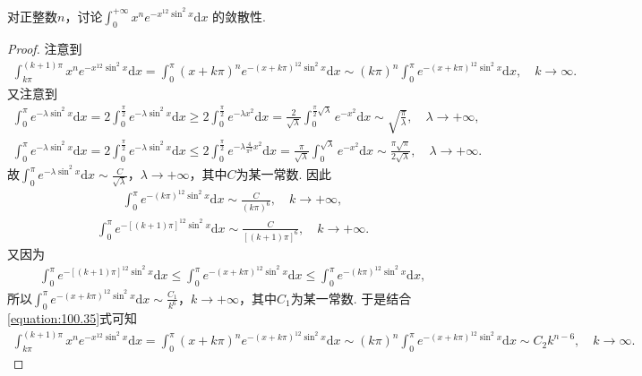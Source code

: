 \documentclass[../../main.tex]{subfiles}
\begin{document}
\begin{example}
对正整数\(n\)，讨论$\int_{0}^{+\infty}x^{n}e^{-x^{12}\sin^{2}x}\mathrm{d}x$
的敛散性. 
\end{example}
\begin{proof}
注意到
\begin{align}\label{equation:100.35}
\int_{k\pi}^{(k+1)\pi}x^ne^{-x^{12}\sin^2x}\mathrm{d}x=\int_0^{\pi}(x+k\pi)^ne^{-(x+k\pi)^{12}\sin^2x}\mathrm{d}x\sim (k\pi)^n\int_0^{\pi}e^{-(x+k\pi)^{12}\sin^2x}\mathrm{d}x,\quad k\rightarrow \infty.
\end{align}
又注意到
\begin{align*}
\int_0^{\pi}e^{-\lambda \sin^2x}\mathrm{d}x=2\int_0^{\frac{\pi}{2}}e^{-\lambda \sin^2x}\mathrm{d}x\geqslant 2\int_0^{\frac{\pi}{2}}e^{-\lambda x^2}\mathrm{d}x=\frac{2}{\sqrt{\lambda}}\int_0^{\frac{\pi}{2}\sqrt{\lambda}}e^{-x^2}\mathrm{d}x\sim \sqrt{\frac{\pi}{\lambda}},\quad \lambda \rightarrow +\infty,
\end{align*}
\begin{align*}
\int_0^{\pi}e^{-\lambda \sin^2x}\mathrm{d}x=2\int_0^{\frac{\pi}{2}}e^{-\lambda \sin^2x}\mathrm{d}x\leqslant 2\int_0^{\frac{\pi}{2}}e^{-\lambda \frac{4}{\pi^2}x^2}\mathrm{d}x=\frac{\pi}{\sqrt{\lambda}}\int_0^{\sqrt{\lambda}}e^{-x^2}\mathrm{d}x\sim \frac{\pi \sqrt{\pi}}{2\sqrt{\lambda}},\quad \lambda \rightarrow +\infty.
\end{align*}
故$\int_0^{\pi}e^{-\lambda \sin^2x}\mathrm{d}x\sim \frac{C}{\sqrt{\lambda}}$，$\lambda \rightarrow +\infty$，其中$C$为某一常数. 因此
\begin{align*}
\int_0^{\pi}e^{-(k\pi)^{12}\sin^2x}\mathrm{d}x\sim \frac{C}{(k\pi)^6},\quad k\rightarrow +\infty,
\end{align*}
\begin{align*}
\int_0^{\pi}e^{-[(k+1)\pi]^{12}\sin^2x}\mathrm{d}x\sim \frac{C}{[(k+1)\pi]^6},\quad k\rightarrow +\infty.
\end{align*}
又因为
\begin{align*}
\int_0^{\pi}e^{-[(k+1)\pi]^{12}\sin^2x}\mathrm{d}x\leqslant \int_0^{\pi}e^{-(x+k\pi)^{12}\sin^2x}\mathrm{d}x\leqslant \int_0^{\pi}e^{-(k\pi)^{12}\sin^2x}\mathrm{d}x,
\end{align*}
所以$\int_0^{\pi}e^{-(x+k\pi)^{12}\sin^2x}\mathrm{d}x\sim \frac{C_1}{k^6}$，$k\rightarrow +\infty$，其中$C_1$为某一常数. 于是结合\eqref{equation:100.35}式可知
\begin{align*}
\int_{k\pi}^{(k+1)\pi}x^ne^{-x^{12}\sin^2x}\mathrm{d}x=\int_0^{\pi}(x+k\pi)^ne^{-(x+k\pi)^{12}\sin^2x}\mathrm{d}x\sim (k\pi)^n\int_0^{\pi}e^{-(x+k\pi)^{12}\sin^2x}\mathrm{d}x\sim C_2k^{n-6},\quad k\rightarrow \infty.

\end{align*}
\end{proof}
\end{document}
